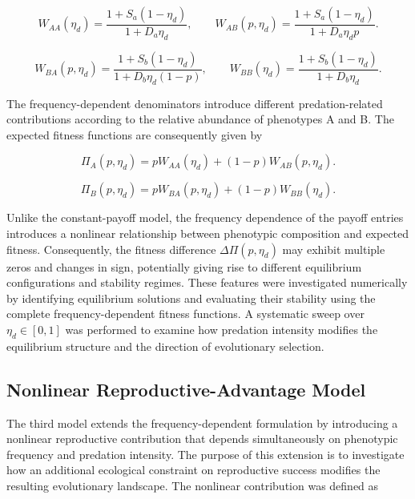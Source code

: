 \begin{equation}
W_{AA}(\eta_d)=\frac{1+S_a(1-\eta_d)}{1+D_a\eta_d},
\qquad
W_{AB}(p,\eta_d)=\frac{1+S_a(1-\eta_d)}{1+D_a\eta_d p}.
\label{eq:frequency_dependent_A}
\end{equation}

\begin{equation}
W_{BA}(p,\eta_d)=\frac{1+S_b(1-\eta_d)}{1+D_b\eta_d(1-p)},
\qquad
W_{BB}(\eta_d)=\frac{1+S_b(1-\eta_d)}{1+D_b\eta_d}.
\label{eq:frequency_dependent_B}
\end{equation}

The frequency-dependent denominators introduce different predation-related contributions according to the relative abundance of phenotypes A and B. The expected fitness functions are consequently given by

\begin{equation}
\Pi_A(p,\eta_d)
=
pW_{AA}(\eta_d)
+(1-p)W_{AB}(p,\eta_d).
\label{eq:frequency_fitness_A}
\end{equation}

\begin{equation}
\Pi_B(p,\eta_d)
=
pW_{BA}(p,\eta_d)
+(1-p)W_{BB}(\eta_d).
\label{eq:frequency_fitness_B}
\end{equation}

Unlike the constant-payoff model, the frequency dependence of the payoff entries introduces a nonlinear relationship between phenotypic composition and expected fitness. Consequently, the fitness difference $\Delta\Pi(p,\eta_d)$ may exhibit multiple zeros and changes in sign, potentially giving rise to different equilibrium configurations and stability regimes. These features were investigated numerically by identifying equilibrium solutions and evaluating their stability using the complete frequency-dependent fitness functions. A systematic sweep over $\eta_d\in[0,1]$ was performed to examine how predation intensity modifies the equilibrium structure and the direction of evolutionary selection. \\ 


\subsection{Nonlinear Reproductive-Advantage Model}
\label{sec:nonlinear_reproductive_methodology}

The third model extends the frequency-dependent formulation by introducing a nonlinear reproductive contribution that depends simultaneously on phenotypic frequency and predation intensity. The purpose of this extension is to investigate how an additional ecological constraint on reproductive success modifies the resulting evolutionary landscape.  The nonlinear contribution was defined as

